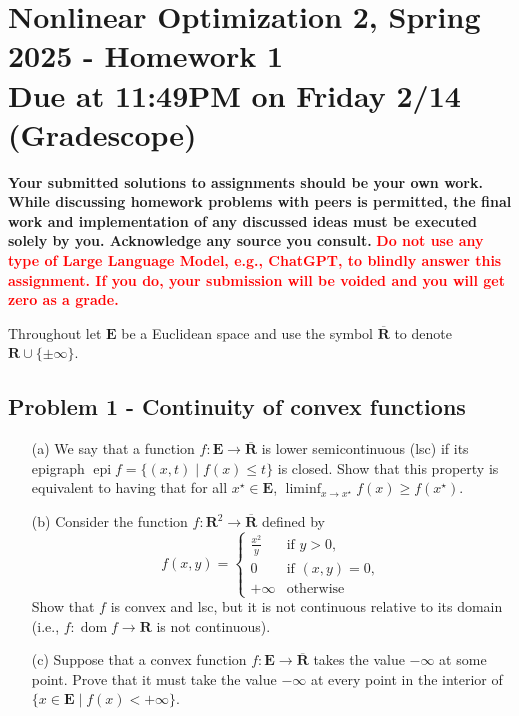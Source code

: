 \documentclass[11pt]{article}
\date{}
\title{}
\newcommand{\RR}{\mathbf{R}}
\newcommand{\E}{\mathbf{E}}
\newcommand{\bR}{\overline{\mathbf{R}}}
\newcommand{\epi}{\operatorname{epi}}
\newcommand{\dom}{\operatorname{dom}}
\begin{document}
\section*{\textbf{Nonlinear Optimization 2, Spring 2025 - Homework 1} \\ Due at 11:49PM on Friday 2/14 (Gradescope)}
\label{sec:org2921ad4}
\textbf{Your submitted solutions to assignments should be your own work. While discussing homework problems with peers is permitted, the final work and implementation of any discussed ideas must be executed solely by you. Acknowledge any source you consult.}
\textbf{\textcolor{red}{Do not use any type of Large Language Model, e.g., ChatGPT, to blindly answer this assignment. If you do, your submission will be voided and you will get zero as a grade.}} \vspace{.5cm}

\noindent Throughout let \(\E\) be a Euclidean space and use the symbol \(\bR\) to denote \(\RR \cup \{\pm \infty\}\).
\subsection*{Problem 1 - Continuity of convex functions}
\label{sec:orga4b7fcc}
\begin{itemize}
\item[(a)] We say that a function $f \colon \E \rightarrow \bR$ is lower semicontinuous (lsc) if its epigraph $\epi f = \{(x, t) \mid f(x) \leq t\}$ is closed. Show that this property is equivalent to having that for all $x^{\star} \in \E$, $\liminf_{x \rightarrow x^{\star}} f(x) \geq f(x^{\star}).$
\item[(b)] Consider the function $f\colon \RR^{2} \rightarrow \bR$ defined by
$$
f(x, y) = \begin{cases} \frac{x^{2}}{y} & \text{if }y>0, \\
0 & \text{if }(x, y) = 0, \\
+ \infty & \text{otherwise} \end{cases}
$$
Show that $f$ is convex and lsc, but it is not continuous relative to its domain (i.e., $f\colon \dom f \rightarrow \RR$ is not continuous).
\item[(c)] Suppose that a convex function $f\colon \E \rightarrow \bR$ takes the value $-\infty$ at some point. Prove that it must take the value $-\infty$ at every point in the interior of $\{x \in \E \mid f(x) < +\infty\}$.
\end{itemize}
\end{document}
